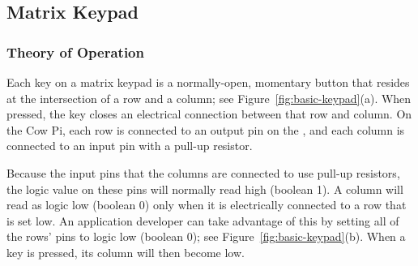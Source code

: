 \subsection{Matrix Keypad}

\subsubsection{Theory of Operation}

Each key on a matrix keypad is a normally-open, momentary button that resides at the intersection of a row and a column;
see Figure~\ref{fig:basic-keypad}(a).
When pressed, the key closes an electrical connection between that row and column.
On the Cow Pi, each row is connected to an output pin on the \mcuboard, and each column is connected to an input pin with a pull-up resistor.

Because the input pins that the columns are connected to use pull-up resistors, the logic value on these pins will normally read high (boolean 1).
A column will read as logic low (boolean 0) only when it is electrically connected to a row that is set low.
An application developer can take advantage of this by setting all of the rows' pins to logic low (boolean 0);
see Figure~\ref{fig:basic-keypad}(b).
When a key is pressed, its column will then become low.

